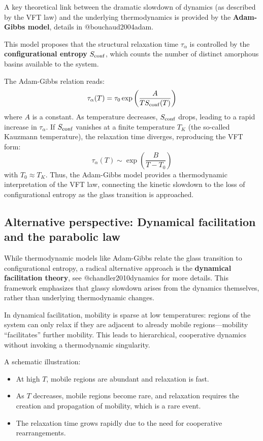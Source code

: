 \documentclass[
  letterpaper,
  enabledeprecatedfontcommands]{report}
\providecommand{\tightlist}{%
  \setlength{\itemsep}{0pt}\setlength{\parskip}{0pt}}
\begin{document}
A key theoretical link between the dramatic slowdown of dynamics (as
described by the VFT law) and the underlying thermodynamics is provided
by the \textbf{Adam-Gibbs model}, details in @bouchaud2004adam.

This model proposes that the structural relaxation time \(\tau_\alpha\)
is controlled by the \textbf{configurational entropy} \(S_{\rm conf}\),
which counts the number of distinct amorphous basins available to the
system.

The Adam-Gibbs relation reads: \[
\tau_\alpha(T) = \tau_0 \exp\left(\frac{A}{T S_{\rm conf}(T)}\right)
\] where \(A\) is a constant. As temperature decreases, \(S_{\rm conf}\)
drops, leading to a rapid increase in \(\tau_\alpha\). If
\(S_{\rm conf}\) vanishes at a finite temperature \(T_K\) (the so-called
Kauzmann temperature), the relaxation time diverges, reproducing the VFT
form: \[
\tau_\alpha(T) \sim \exp\left(\frac{B}{T - T_0}\right)
\] with \(T_0 \approx T_K\). Thus, the Adam-Gibbs model provides a
thermodynamic interpretation of the VFT law, connecting the kinetic
slowdown to the loss of configurational entropy as the glass transition
is approached.

\subsection{Alternative perspective: Dynamical facilitation and the
parabolic
law}\label{alternative-perspective-dynamical-facilitation-and-the-parabolic-law}

While thermodynamic models like Adam-Gibbs relate the glass transition
to configurational entropy, a radical alternative approach is the
\textbf{dynamical facilitation theory}, see @chandler2010dynamics for
more details. This framework emphasizes that glassy slowdown arises from
the dynamics themselves, rather than underlying thermodynamic changes.

In dynamical facilitation, mobility is sparse at low temperatures:
regions of the system can only relax if they are adjacent to already
mobile regions---mobility ``facilitates'' further mobility. This leads
to hierarchical, cooperative dynamics without invoking a thermodynamic
singularity.

A schematic illustration:

\begin{itemize}
\tightlist
\item
  At high \(T\), mobile regions are abundant and relaxation is fast.
\item
  As \(T\) decreases, mobile regions become rare, and relaxation
  requires the creation and propagation of mobility, which is a rare
  event.
\item
  The relaxation time grows rapidly due to the need for cooperative
  rearrangements.
\end{itemize}
\end{document}
